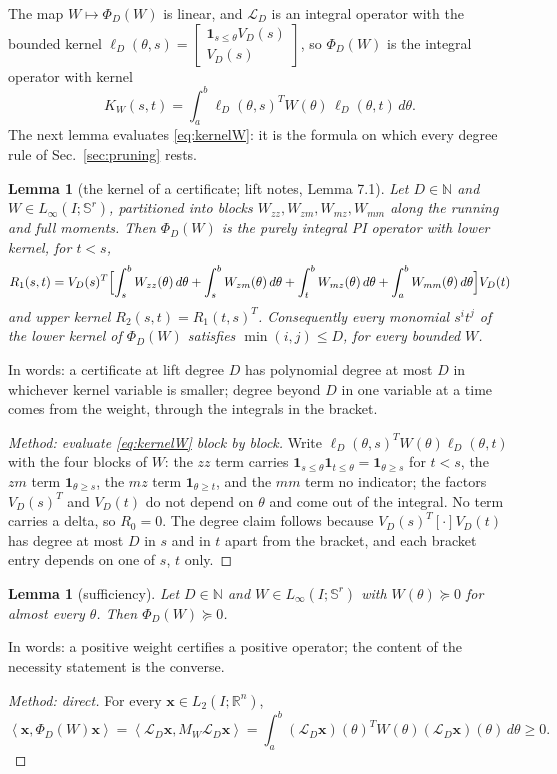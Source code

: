 \documentclass[12pt]{article}
\newcommand{\R}{\mathbb{R}}
\newcommand{\N}{\mathbb{N}}
\newcommand{\Sym}[1]{\mathbb{S}^{#1}}
\newcommand{\mcl}[1]{\mathcal{#1}}
\newcommand{\mbf}[1]{\mathbf{#1}}
\newcommand{\bmat}[1]{\begin{bmatrix} #1 \end{bmatrix}}
\newcommand{\ip}[2]{\left\langle #1,#2\right\rangle}
\theoremstyle{plain}
\newtheorem{lemma}[theorem]{Lemma}
\theoremstyle{definition}
\theoremstyle{remark}
\begin{document}
The map $W\mapsto\Phi_D(W)$ is linear, and $\mcl L_D$ is an integral operator with the bounded kernel $\ell_D(\theta,s)=\bmat{\mathbf 1_{s\le\theta}V_D(s)\\ V_D(s)}$, so $\Phi_D(W)$ is the integral operator with kernel
\begin{equation}\label{eq:kernelW}
K_W(s,t)=\int_a^b\ell_D(\theta,s)^TW(\theta)\,\ell_D(\theta,t)\,d\theta .
\end{equation}
The next lemma evaluates \eqref{eq:kernelW}: it is the formula on which every degree rule of Sec.~\ref{sec:pruning} rests.

\begin{lemma}[the kernel of a certificate; lift notes, Lemma 7.1]\label{lem:kernel}
Let $D\in\N$ and $W\in L_\infty(I;\Sym{r})$, partitioned into blocks $W_{zz},W_{zm},W_{mz},W_{mm}$ along the running and full moments. Then $\Phi_D(W)$ is the purely integral PI operator with lower kernel, for $t<s$,
\[
R_1(s,t)=V_D(s)^T\Bigl[\int_s^bW_{zz}(\theta)\,d\theta+\int_s^bW_{zm}(\theta)\,d\theta+\int_t^bW_{mz}(\theta)\,d\theta+\int_a^bW_{mm}(\theta)\,d\theta\Bigr]V_D(t)
\]
and upper kernel $R_2(s,t)=R_1(t,s)^T$. Consequently every monomial $s^it^j$ of the lower kernel of $\Phi_D(W)$ satisfies $\min(i,j)\le D$, for every bounded $W$.
\end{lemma}
In words: a certificate at lift degree $D$ has polynomial degree at most $D$ in whichever kernel variable is smaller; degree beyond $D$ in one variable at a time comes from the weight, through the integrals in the bracket.
\begin{proof}[Method: evaluate \eqref{eq:kernelW} block by block]
Write $\ell_D(\theta,s)^TW(\theta)\ell_D(\theta,t)$ with the four blocks of $W$: the $zz$ term carries $\mathbf 1_{s\le\theta}\mathbf 1_{t\le\theta}=\mathbf 1_{\theta\ge s}$ for $t<s$, the $zm$ term $\mathbf 1_{\theta\ge s}$, the $mz$ term $\mathbf 1_{\theta\ge t}$, and the $mm$ term no indicator; the factors $V_D(s)^T$ and $V_D(t)$ do not depend on $\theta$ and come out of the integral. No term carries a delta, so $R_0=0$. The degree claim follows because $V_D(s)^T[\cdot]V_D(t)$ has degree at most $D$ in $s$ and in $t$ apart from the bracket, and each bracket entry depends on one of $s$, $t$ only.
\end{proof}

\begin{lemma}[sufficiency]\label{lem:sufficiency}
Let $D\in\N$ and $W\in L_\infty(I;\Sym r)$ with $W(\theta)\succeq0$ for almost every $\theta$. Then $\Phi_D(W)\succeq0$.
\end{lemma}
In words: a positive weight certifies a positive operator; the content of the necessity statement is the converse.
\begin{proof}[Method: direct]
For every $\mbf x\in L_2(I;\R^n)$,
\[
\ip{\mbf x}{\Phi_D(W)\mbf x}=\ip{\mcl L_D\mbf x}{M_W\mcl L_D\mbf x}=\int_a^b(\mcl L_D\mbf x)(\theta)^TW(\theta)(\mcl L_D\mbf x)(\theta)\,d\theta\ge0 .
\]
\end{proof}
\end{document}
